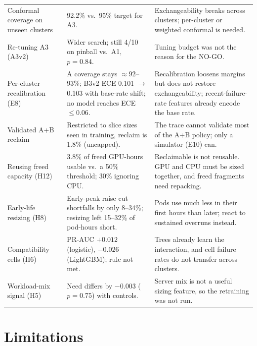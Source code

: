 \documentclass[11pt]{article}
\newcommand{\ra}{$\rightarrow$}
\begin{document}
\begin{longtable}{@{}p{3.4cm}p{5.6cm}p{5.6cm}@{}}
Conformal coverage on unseen clusters & 92.2\% vs.\ 95\% target for A3. & Exchangeability breaks across clusters; per-cluster or weighted conformal is needed. \\
Re-tuning A3 (A3v2) & Wider search; still 4/10 on pinball vs.\ A1, $p = 0.84$. & Tuning budget was not the reason for the NO-GO. \\
Per-cluster recalibration (E8) & A coverage stays $\approx$92--93\%; B3v2 ECE 0.101 \ra 0.103 with base-rate shift; no model reaches ECE $\le 0.06$. & Recalibration loosens margins but does not restore exchangeability; recent-failure-rate features already encode the base rate. \\
Validated A+B reclaim & Restricted to slice sizes seen in training, reclaim is 1.8\% (uncapped). & The trace cannot validate most of the A+B policy; only a simulator (E10) can. \\
Reusing freed capacity (H12) & 3.8\% of freed GPU-hours usable vs.\ a 50\% threshold; 30\% ignoring CPU. & Reclaimable is not reusable. GPU and CPU must be sized together, and freed fragments need repacking. \\
Early-life resizing (H8) & Early-peak raise cut shortfalls by only 8--34\%; resizing left 15--32\% of pod-hours short. & Pods use much less in their first hours than later; react to sustained overruns instead. \\
Compatibility cells (H6) & PR-AUC $+0.012$ (logistic), $-0.026$ (LightGBM); rule not met. & Trees already learn the interaction, and cell failure rates do not transfer across clusters. \\
Workload-mix signal (H5) & Need differs by $-0.003$ ($p = 0.75$) with controls. & Server mix is not a useful sizing feature, so the retraining was not run. \\
\bottomrule
\end{longtable}







\section{Limitations}
\label{sec:limitations}
\end{document}
